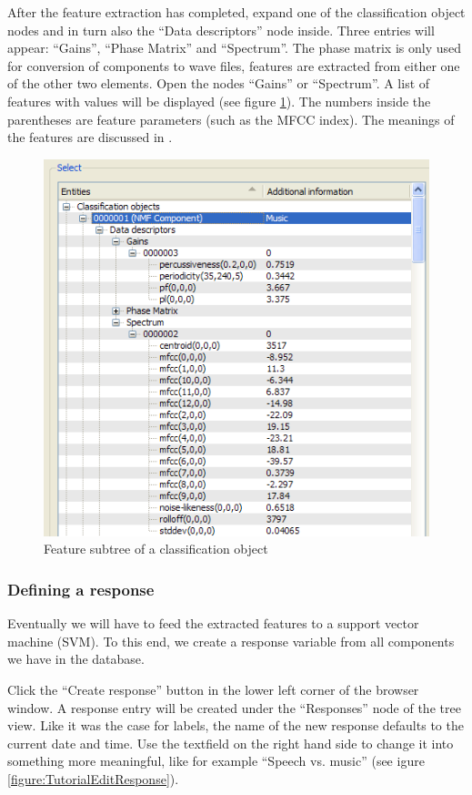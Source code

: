 After the feature extraction has completed, expand one of the classification
object nodes and in turn also the ``Data descriptors'' node inside. Three
entries will appear: ``Gains'', ``Phase Matrix'' and ``Spectrum''. The phase
matrix is only used for conversion of components to wave files, features are
extracted from either one of the other two elements. Open the nodes ``Gains'' or
``Spectrum''. A list of features with values will be displayed (see figure
\ref{figure:TutorialFeatureSubtree}). The numbers inside the parentheses are
feature parameters (such as the MFCC index). The meanings of the features are
discussed in \cite{Schuller2009}.

\begin{figure}
    \centering
    \includegraphics[width=.8\textwidth]{tutorial-media/FeatureSubtree.png}
    \caption{%
        \label{figure:TutorialFeatureSubtree}%
        Feature subtree of a classification object
    }
\end{figure}


\subsubsection{Defining a response}

Eventually we will have to feed the extracted features to a support vector
machine (SVM). To this end, we create a response variable from all components we
have in the database.

Click the ``Create response'' button in the lower left corner of the browser
window. A response entry will be created under the ``Responses'' node of the
tree view. Like it was the case for labels, the name of the new response
defaults to the current date and time. Use the textfield on the right hand side
to change it into something more meaningful, like for example ``Speech
vs. music'' (see igure \ref{figure:TutorialEditResponse}).

